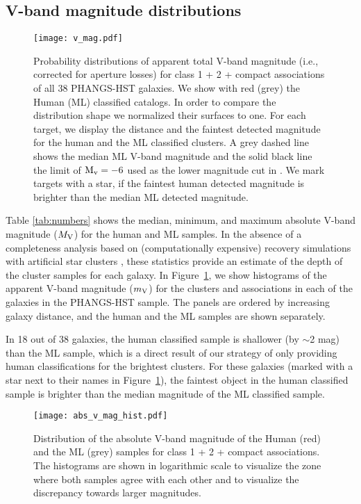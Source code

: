 \documentclass[linenumbers]{aastex63}
\begin{document}
{\subsection{V-band magnitude distributions}\label{ssect:v_mag}
%
\begin{figure*} 
\texttt{[image: v\_mag.pdf]}
 \caption{Probability distributions of apparent total V-band magnitude (i.e., corrected for aperture losses) for class 1 + 2 + compact associations of all 38 PHANGS-HST galaxies. We show with red (grey) the Human (ML) classified catalogs. In order to compare the distribution shape we normalized their surfaces to one. 
 For each target, we display the distance and the faintest detected magnitude for the human and the ML classified clusters. A grey dashed line shows the median ML V-band magnitude and the solid black line the limit of ${\rm M_v=-6}$ used as the lower magnitude cut in \citet{adamo_legacy_2017}. We mark targets with a star, if the faintest human detected magnitude is brighter than the median ML detected magnitude.}
 \label{fig:v_mag_panel}
\end{figure*}
%
Table \ref{tab:numbers} shows the median, minimum, and maximum absolute V-band
magnitude ($M_{\rm V}$) for the human and ML samples.  In the absence of a completeness analysis based on (computationally expensive) recovery simulations with artificial star clusters \citep[e.g.][]{adamo_legacy_2017, messa_young_2018, linden_massive_2021, linden_star_2022, tang_cluster_2023}, these statistics provide an estimate of the depth of the cluster samples for each galaxy. In Figure~\ref{fig:v_mag_panel}, we show histograms of the apparent V-band magnitude ($m_{\rm V}$) for the clusters and associations in each of the galaxies in the PHANGS-HST sample. The panels are ordered by increasing galaxy distance, and the human and the ML samples are shown separately.

In 18 out of 38 galaxies, the human classified sample is shallower (by $\sim$2 mag) than the ML sample, which is a direct result of our strategy of only providing human classifications for the brightest clusters. %
For these galaxies (marked with a star next to their names in Figure~\ref{fig:v_mag_panel}), the faintest object in the human classified sample is brighter than the median magnitude of the ML classified sample. 
%
\begin{figure} 
\texttt{[image: abs\_v\_mag\_hist.pdf]}
 \caption{Distribution of the absolute V-band magnitude of the Human (red) and the ML (grey) samples for class 1 + 2 + compact associations. The histograms are shown in logarithmic scale to visualize the zone where both samples agree with each other and to visualize the discrepancy towards larger magnitudes.}
 \label{fig:v_abs_mag}
\end{figure}
%

}
\end{document}
